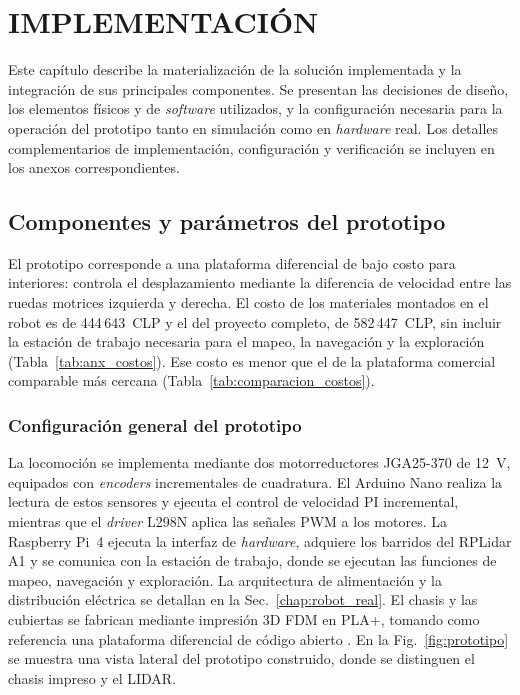 \chapter{IMPLEMENTACIÓN}
\label{ch:implementacion}

Este capítulo describe la materialización de la solución implementada y la
integración de sus principales componentes. Se presentan las decisiones de
diseño, los elementos físicos y de \textit{software} utilizados, y la configuración
necesaria para la operación del prototipo tanto en simulación como en \textit{hardware} real. Los detalles complementarios de implementación, configuración y verificación se incluyen en los anexos correspondientes.

\section{Componentes y parámetros del prototipo}
\label{ch:componentes}

El prototipo corresponde a una plataforma diferencial de bajo costo para interiores: controla el desplazamiento mediante la diferencia de velocidad entre las ruedas motrices izquierda y derecha. El costo de los materiales montados en el robot es de 444\,643~CLP y el del proyecto completo, de 582\,447~CLP, sin incluir la estación de trabajo necesaria para el mapeo, la navegación y la exploración (Tabla~\ref{tab:anx_costos}). Ese costo es menor que el de la plataforma comercial comparable más cercana (Tabla~\ref{tab:comparacion_costos}).

\subsection{Configuración general del prototipo}

La locomoción se implementa mediante dos motorreductores JGA25-370 de 12~V,
equipados con \textit{encoders} incrementales de cuadratura. El \gls{Arduino} Nano
realiza la lectura de estos sensores y ejecuta el control de velocidad PI incremental,
mientras que el \textit{driver} L298N aplica las señales \gls{PWM} a los motores. La
Raspberry Pi~4 ejecuta la interfaz de \textit{hardware}, adquiere los barridos del
RPLidar A1 y se comunica con la estación de trabajo, donde se ejecutan las
funciones de mapeo, navegación y exploración.
La arquitectura de alimentación y la distribución eléctrica se detallan en
la Sec.~\ref{chap:robot_real}. El chasis y las cubiertas se fabrican
mediante impresión 3D FDM en PLA+, tomando como referencia una plataforma
diferencial de código abierto
\citep{marcuslanzoni2020vacuum}.
En la Fig.~\ref{fig:prototipo} se muestra una vista lateral del prototipo
construido, donde se distinguen el chasis impreso y el LIDAR.

